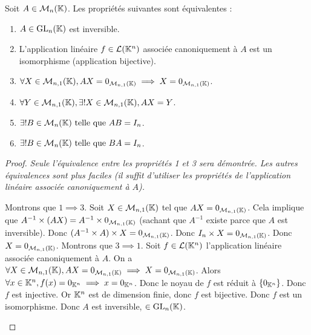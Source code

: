 \documentclass[12pt,a4paper]{report}
\begin{document}
\begin{property}
    Soit $A \in \mathcal M_n(\mathbb{K})$. Les propriétés suivantes sont équivalentes :
    \begin{enumerate}
        \item $A \in \mathrm{GL}_n(\mathbb{K})$ est inversible.
        \item L'application linéaire $f \in \mathcal L(\mathbb{K}^n)$ associée canoniquement à $A$ est un isomorphisme (application bijective).
        \item $\forall X \in \mathcal M_{n,1}(\mathbb{K}), AX = 0_{\mathcal M_{n,1}(\mathbb{K})} \implies X = 0_{\mathcal M_{n,1}(\mathbb{K})}$.
        \item $\forall Y \in \mathcal M_{n,1}(\mathbb{K}), \exists ! X \in \mathcal M_{n,1}(\mathbb{K}), AX = Y$.
        \item $\exists ! B \in \mathcal M_n(\mathbb{K}) \text{ telle que } AB = I_n$.
        \item $\exists ! B \in \mathcal M_n(\mathbb{K}) \text{ telle que } BA = I_n$.
    \end{enumerate}
\end{property}

\begin{proof}
    \textit{Seule l'équivalence entre les propriétés 1 et 3 sera démontrée. Les autres équivalences sont plus faciles (il suffit d'utiliser les propriétés de l'application linéaire associée canoniquement à $A$).}

    \begin{outline}
        \1 Montrons que $1 \implies 3$.
        \2 Soit $X \in \mathcal M_{n,1}(\mathbb{K})$ tel que $AX = 0_{\mathcal M_{n,1}(\mathbb{K})}$.
        \2 Cela implique que $A^{-1} \times (AX) = A^{-1} \times 0_{\mathcal M_{n,1}(\mathbb{K})}$ (sachant que $A^{-1}$ existe parce que $A$ est inversible).
        \2 Donc $(A^{-1} \times A) \times X = 0_{\mathcal M_{n,1}(\mathbb{K})}$.
        \2 Donc $I_n \times X = 0_{\mathcal M_{n,1}(\mathbb{K})}$.
        \2 Donc $X = 0_{\mathcal M_{n,1}(\mathbb{K})}$.
        \1 Montrons que $3 \implies 1$.
        \2 Soit $f \in \mathcal L(\mathbb{K}^n)$ l'application linéaire associée canoniquement à $A$.
        \2 On a $\forall X \in \mathcal M_{n,1}(\mathbb{K}), AX = 0_{\mathcal M_{n,1}(\mathbb{K})} \implies X = 0_{\mathcal M_{n,1}(\mathbb{K})}$.
        \2 Alors $\forall x \in \mathbb{K}^n, f(x) = 0_{\mathbb{K}^n} \implies x = 0_{\mathbb{K}^n}$.
        \2 Donc le noyau de $f$ est réduit à $\{0_{\mathbb{K}^n}\}$.
        \2 Donc $f$ est injective.
        \2 Or $\mathbb{K}^n$ est de dimension finie, donc $f$ est bijective.
        \2 Donc $f$ est un isomorphisme.
        \2 Donc $A$ est inversible, $\in \mathrm{GL}_n(\mathbb{K})$.
    \end{outline}
\end{proof}
\end{document}
